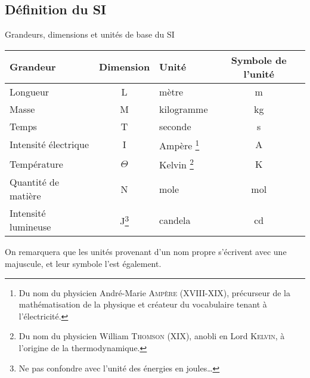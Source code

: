 \documentclass[../main/main.tex]{subfiles}
\begin{document}
\subsection{Définition du SI}

\begin{defi}[label=def:si]{{Grandeurs, dimensions et unités de base du SI}}
	\begin{center}
		\begin{tabular}{lclc}
			\toprule
			Grandeur             & Dimension                                    & Unité      & Symbole de l'unité \\
			\midrule
			Longueur             & L                                            & mètre      & m                  \\
			Masse                & M                                            & kilogramme & kg                 \\
			Temps                & T                                            & seconde    & s                  \\
			Intensité électrique & I                                            & Ampère
			\footnote{Du nom du physicien
				André-Marie \textsc{Ampère} (XVIII-XIX\ieme), précurseur de la
				mathématisation de la physique et créateur du vocabulaire tenant à
				l'électricité.}
			                     & A                                                                              \\
			Température          & $\Theta$                                     & Kelvin
			\footnote{Du nom du physicien William \textsc{Thomson} (XIX\ieme),
				anobli en Lord \textsc{Kelvin}, à l'origine de la thermodynamique.}
			                     & K                                                                              \\
			Quantité de matière  & N                                            & mole       & mol                \\
			Intensité lumineuse  & J\footnote{Ne pas confondre avec l'unité des
				énergies en joules…}
			                     & candela                                      & cd                              \\
			\bottomrule
		\end{tabular}
	\end{center}
\end{defi}

On remarquera que les unités provenant d'un nom propre s'écrivent avec une
majuscule, et leur symbole l'est également.
\end{document}

